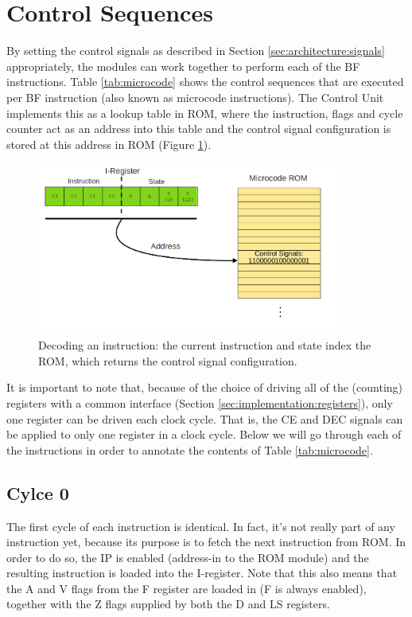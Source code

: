 \section{Control Sequences} \label{sec:sequences}
By setting the control signals as described in Section \ref{sec:architecture:signals} appropriately, the modules can work together to perform each of the BF instructions. Table \ref{tab:microcode} shows the control sequences that are executed per BF instruction (also known as microcode instructions). The Control Unit implements this as a lookup table in ROM, where the instruction, flags and cycle counter act as an address into this table and the control signal configuration is stored at this address in ROM (Figure \ref{fig:decoder}).

\begin{figure}[H]
  \centering
  \includegraphics[width=0.9\textwidth]{img/instruction_decoding}
  \caption{Decoding an instruction: the current instruction and state index the ROM, which returns the control signal configuration.}
  \label{fig:decoder}
\end{figure}

It is important to note that, because of the choice of driving all of the (counting) registers with a common interface (Section \ref{sec:implementation:registers}), only one register can be driven each clock cycle. That is, the CE and DEC signals can be applied to only one register in a clock cycle. Below we will go through each of the instructions in order to annotate the contents of Table \ref{tab:microcode}.


\subsection{Cylce 0}
The first cycle of each instruction is identical. In fact, it's not really part of any instruction yet, because its purpose is to fetch the next instruction from ROM. In order to do so, the IP is enabled (address-in to the ROM module) and the resulting instruction is loaded into the I-register. Note that this also means that the A and V flags from the F register are loaded in (F is always enabled), together with the Z flags supplied by both the D and LS registers.

